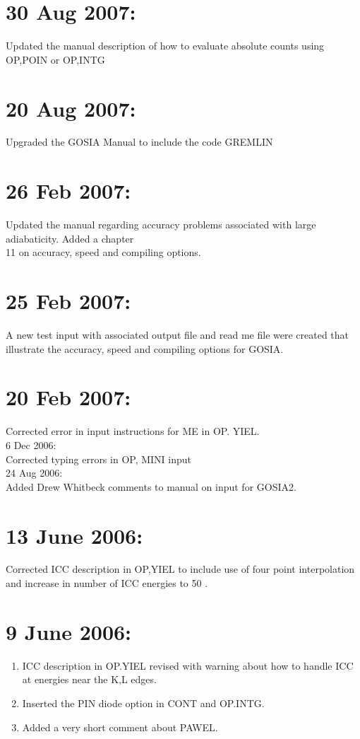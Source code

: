 \documentclass[10pt]{article}
\begin{document}
\section*{30 Aug 2007:}
Updated the manual description of how to evaluate absolute counts using OP,POIN or OP,INTG

\section*{20 Aug 2007:}
Upgraded the GOSIA Manual to include the code GREMLIN

\section*{26 Feb 2007:}
Updated the manual regarding accuracy problems associated with large adiabaticity. Added a chapter\\
11 on accuracy, speed and compiling options.

\section*{25 Feb 2007:}
A new test input with associated output file and read me file were created that illustrate the accuracy, speed and compiling options for GOSIA.

\section*{20 Feb 2007:}
Corrected error in input instructions for ME in OP. YIEL.\\
6 Dec 2006:\\
Corrected typing errors in OP, MINI input\\
24 Aug 2006:\\
Added Drew Whitbeck comments to manual on input for GOSIA2.

\section*{13 June 2006:}
Corrected ICC description in OP,YIEL to include use of four point interpolation and increase in number of ICC energies to 50 .

\section*{9 June 2006:}
\begin{enumerate}
  \item ICC description in OP.YIEL revised with warning about how to handle ICC at energies near the K,L edges.
  \item Inserted the PIN diode option in CONT and OP.INTG.
  \item Added a very short comment about PAWEL.
\end{enumerate}
\end{document}
